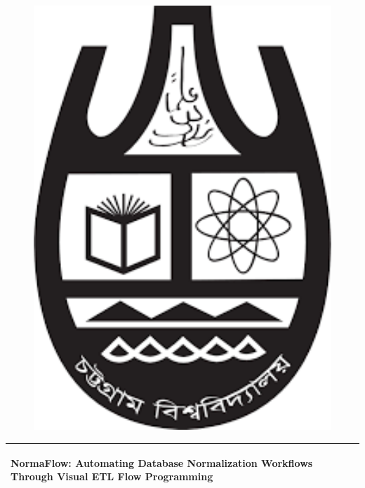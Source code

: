 \documentclass{article}
\begin{document}
\begin{titlepage}

\begin{figure}
	\centering
	\begin{minipage}[b]{0.15\textwidth}
		\includegraphics[width=1\textwidth]{cu.png} 
	\end{minipage} \hfill
\end{figure}
	
\noindent%
  \begin{tabular}{@{}p{\textwidth}@{}}
    \hline
    \hline
    \vspace{0.2cm}
    \begin{center}
    \Huge{\textbf{
 NormaFlow: Automating Database Normalization Workflows Through Visual ETL Flow Programming
    }}
    \end{center}
    \vspace{0.2cm}\\
    \hline
    \hline
  \end{tabular}
  \vspace{4 cm}


\end{titlepage}
\end{document}
